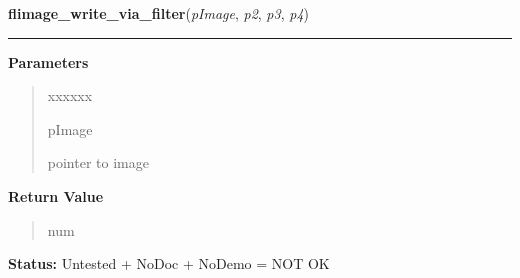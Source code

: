 \hspace{.8\funcindent}\begin{boxedminipage}{\funcwidth}

    \raggedright \textbf{flimage\_write\_via\_filter}(\textit{pImage}, \textit{p2}, \textit{p3}, \textit{p4})

    \vspace{-1.5ex}

    \rule{\textwidth}{0.5\fboxrule}
\setlength{\parskip}{2ex}
\setlength{\parskip}{1ex}
      \textbf{Parameters}
      \vspace{-1ex}

      \begin{quote}
        \begin{Ventry}{xxxxxx}

          \item[pImage]

          pointer to image

        \end{Ventry}

      \end{quote}

      \textbf{Return Value}
    \vspace{-1ex}

      \begin{quote}
      num

      \end{quote}

\textbf{Status:} Untested + NoDoc + NoDemo = NOT OK



    \end{boxedminipage}

    \label{xformslib:flflimage:flimage_free}

    \vspace{0.5ex}

